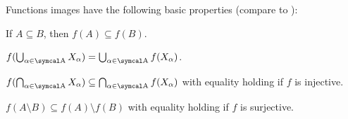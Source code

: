 \begin{proposition}\label{thm:function_image_properties}
  Functions images have the following basic properties (compare to ):
  \begin{propenum}
     If \( A \subseteq B \), then \( f(A) \subseteq f(B) \).

     \( f(\bigcup_{\al \in \CA} X_\al) = \bigcup_{\al \in \CA} f(X_\al) \).

     \( f(\bigcap_{\al \in \CA} X_\al) \subseteq \bigcap_{\al \in \CA} f(X_\al) \) with equality holding if \( f \) is injective.

     \( f(A \setminus B) \subseteq f(A) \setminus f(B) \) with equality holding if \( f \) is surjective.
  \end{propenum}
\end{proposition}
